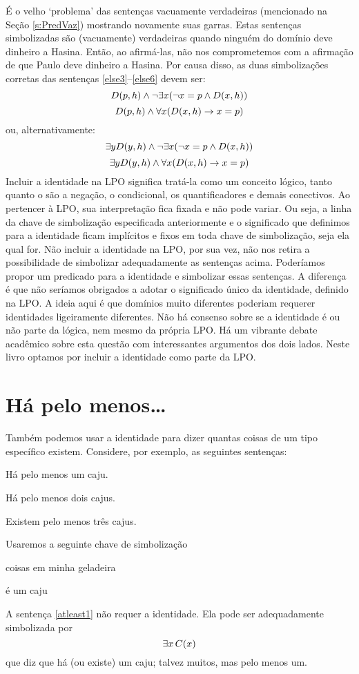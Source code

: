 É o velho `problema' das sentenças vacuamente verdadeiras (mencionado na Seção \ref{s:PredVaz}) mostrando novamente suas garras.
Estas sentenças simbolizadas são (vacuamente) verdadeiras quando ninguém do domínio deve dinheiro a Hasina.
Então, ao afirmá-las, não nos comprometemos com a afirmação de que Paulo deve dinheiro a Hasina.
Por causa disso, as duas simbolizações corretas das sentenças \ref{else3}--\ref{else6} devem ser:
$$\mathord{D}(p,h)\wedge \neg\exists x(\neg x = p \wedge \mathord{D}(x,h))$$
$$\mathord{D}(p,h)\wedge \forall x (\mathord{D}(x,h) \rightarrow x = p)$$
ou, alternativamente:
$$\exists y \mathord{D}(y,h)\wedge \neg\exists x(\neg x = p \wedge \mathord{D}(x,h))$$
$$\exists y \mathord{D}(y,h)\wedge \forall x (\mathord{D}(x,h) \rightarrow x = p)$$
Incluir a identidade na LPO significa tratá-la como um conceito lógico, tanto quanto o são a negação, o condicional, os quantificadores e demais conectivos.
Ao pertencer à LPO, sua interpretação fica fixada e não pode variar.
Ou seja, a linha da chave de simbolização especificada anteriormente e o significado que definimos para a identidade ficam implícitos e fixos em toda chave de simbolização, seja ela qual for.
Não incluir a identidade na LPO, por sua vez, não nos retira a possibilidade de simbolizar adequadamente as sentenças acima.
Poderíamos propor um predicado para a identidade e simbolizar essas sentenças.
A diferença é que não seríamos obrigados a adotar o significado único da identidade, definido na LPO.
A ideia aqui é que domínios muito diferentes poderiam requerer identidades ligeiramente diferentes.
Não há consenso sobre se a identidade é ou não parte da lógica, nem mesmo da própria LPO.
Há um vibrante debate acadêmico sobre esta questão com interessantes argumentos dos dois lados.
Neste livro optamos por incluir a identidade como parte da LPO.


\section{Há pelo menos\ldots}\label{s:HaPeloMenos}
Também podemos usar a identidade para dizer quantas coisas de um tipo específico existem. Considere, por exemplo, as seguintes sentenças:
\begin{earg}
\item[\ex{atleast1}] Há pelo menos um caju.
\item[\ex{atleast2}] Há pelo menos dois cajus.
\item[\ex{atleast3}] Existem pelo menos três cajus.
\end{earg}
Usaremos a seguinte chave de simbolização
	\begin{center}
	\begin{ekey}
		\item[\text{domínio}] coisas em minha geladeira
		\item[\atom{C}{x}]  é um caju
	\end{ekey}
	\end{center}
A sentença \ref{atleast1} não requer a identidade.
Ela pode ser adequadamente simbolizada por
$$\exists x\, \mathord{C}(x)$$
que diz que há (ou existe) um caju; talvez muitos, mas pelo menos um.


